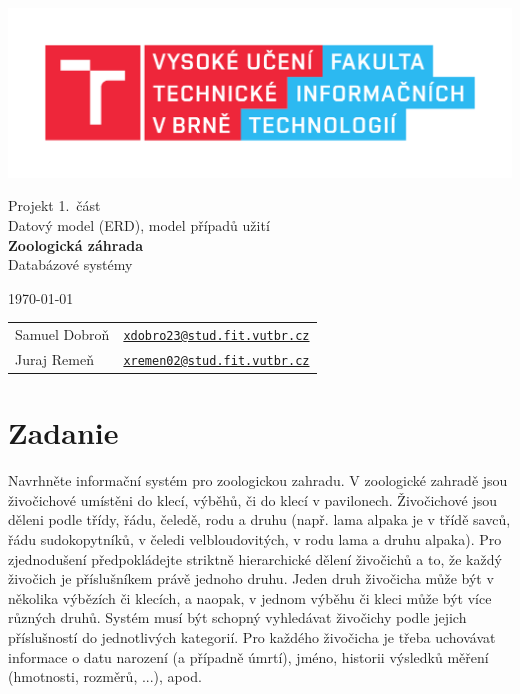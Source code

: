 \documentclass[11pt, a4paper]{article}
\begin{document}
	\begin{titlepage}
		\begin{center}
			\includegraphics[width=0.77 \linewidth]{FIT_logo.pdf} \\


			\Huge{Projekt 1.~část} \\
			\Huge{Datový model (ERD), model případů užití} \\
			\LARGE{\textbf{Zoologická záhrada}} \\
			\Large{Databázové systémy}

		\end{center}

		{\Large
			\today
			\hfill
			\begin{tabular}{ll}
			Samuel Dobroň & \href{mailto:xdobro23@stud.fit.vutbr.cz}{\texttt{xdobro23@stud.fit.vutbr.cz}} \\
            Juraj Remeň & \href{mailto:xremen02@stud.fit.vutbr.cz}{\texttt{xremen02@stud.fit.vutbr.cz}}
\end{tabular}
}
	\end{titlepage}
		\tableofcontents
		\section{Zadanie}
		Navrhněte informační systém pro zoologickou zahradu. V zoologické zahradě jsou živočichové umístěni do klecí, výběhů, či do klecí v pavilonech. Živočichové jsou děleni podle třídy, řádu, čeledě, rodu a druhu (např. lama alpaka je v třídě savců, řádu sudokopytníků, v čeledi velbloudovitých, v rodu lama a druhu alpaka). Pro zjednodušení předpokládejte striktně hierarchické dělení živočichů a to, že každý živočich je příslušníkem právě jednoho druhu. Jeden druh živočicha může být v několika výbězích či klecích, a naopak, v jednom výběhu či kleci může být více různých druhů. Systém musí být schopný vyhledávat živočichy podle jejich příslušností do jednotlivých kategorií. Pro každého živočicha je třeba uchovávat informace o datu narození (a případně úmrtí), jméno, historii výsledků měření (hmotnosti, rozměrů, ...), apod.
\end{document}
